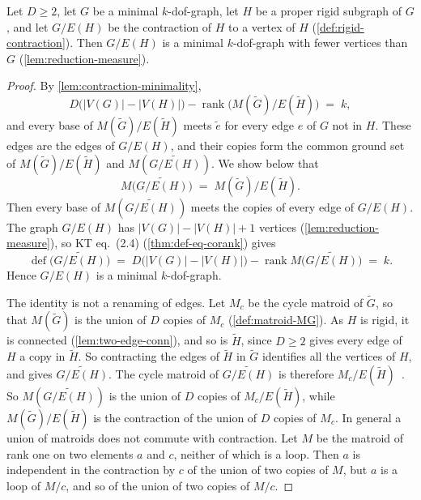 \begin{lemma}
  \label{lem:rigidContract-isMinimalKDof}
  \leanok
  Let $D \ge 2$, let $G$ be a minimal $k$-dof-graph, let $H$ be a proper
  rigid subgraph of $G$, and let $G/E(H)$ be the contraction of $H$ to a
  vertex of $H$ (\cref{def:rigid-contraction}). Then $G/E(H)$ is a
  minimal $k$-dof-graph with fewer vertices than $G$
  (\cref{lem:reduction-measure}).
\end{lemma}
\begin{proof}
  \leanok
  By \cref{lem:contraction-minimality},
  \[
    D\bigl(|V(G)| - |V(H)|\bigr)
      - \operatorname{rank}\bigl(M(\tilde G)/E(\tilde H)\bigr) \;=\; k,
  \]
  and every base of $M(\tilde G)/E(\tilde H)$ meets $\tilde e$ for every
  edge $e$ of $G$ not in $H$. These edges are the edges of $G/E(H)$, and
  their copies form the common ground set of $M(\tilde G)/E(\tilde H)$
  and $M(\widetilde{G/E(H)})$. We show below that
  \[
    M\bigl(\widetilde{G/E(H)}\bigr) \;=\; M(\tilde G)/E(\tilde H).
  \]
  Then every base of $M(\widetilde{G/E(H)})$ meets the copies of every
  edge of $G/E(H)$. The graph $G/E(H)$ has $|V(G)| - |V(H)| + 1$
  vertices (\cref{lem:reduction-measure}), so KT eq.~(2.4)
  (\cref{thm:def-eq-corank}) gives
  \[
    \operatorname{def}\bigl(\widetilde{G/E(H)}\bigr)
    \;=\; D\bigl(|V(G)| - |V(H)|\bigr)
      - \operatorname{rank} M\bigl(\widetilde{G/E(H)}\bigr) \;=\; k.
  \]
  Hence $G/E(H)$ is a minimal $k$-dof-graph.

  The identity is not a renaming of edges. Let $M_c$ be the cycle matroid
  of $\tilde G$, so that $M(\tilde G)$ is the union of $D$ copies of
  $M_c$ (\cref{def:matroid-MG}). As $H$ is rigid, it is connected
  (\cref{lem:two-edge-conn}), and so is $\tilde H$, since $D \ge 2$ gives
  every edge of $H$ a copy in $\tilde H$. So contracting the edges of
  $\tilde H$ in $\tilde G$ identifies all the vertices of $H$, and gives
  $\widetilde{G/E(H)}$. The cycle matroid of $\widetilde{G/E(H)}$ is
  therefore $M_c/E(\tilde H)$~\cite[Proposition~3.2.1]{oxley2011}. So
  $M(\widetilde{G/E(H)})$ is the union of $D$ copies of $M_c/E(\tilde H)$,
  while $M(\tilde G)/E(\tilde H)$ is the contraction of the union of $D$
  copies of $M_c$. In general a union of matroids does not commute with
  contraction. Let $M$ be the matroid of rank one on two elements $a$ and
  $c$, neither of which is a loop. Then $a$ is independent in the
  contraction by $c$ of the union of two copies of $M$, but $a$ is a loop
  of $M/c$, and so of the union of two copies of $M/c$.


\end{proof}
